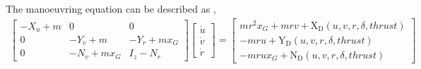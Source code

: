 The manoeuvring equation can be described as \cite{fossen_handbook_2021},
\begin{equation}\label{equation:02.01_manoeuvring models:eqqsystem}
\begin{split}\displaystyle \left[\begin{matrix}- X_{\dot{u}} + m & 0 & 0\\0 & - Y_{\dot{v}} + m & - Y_{\dot{r}} + m x_{G}\\0 & - N_{\dot{v}} + m x_{G} & I_{z} - N_{\dot{r}}\end{matrix}\right] \left[\begin{matrix}\dot{u}\\\dot{v}\\\dot{r}\end{matrix}\right] = \left[\begin{matrix}m r^{2} x_{G} + m r v + \operatorname{X_{D}}{\left(u,v,r,\delta,thrust \right)}\\- m r u + \operatorname{Y_{D}}{\left(u,v,r,\delta,thrust \right)}\\- m r u x_{G} + \operatorname{N_{D}}{\left(u,v,r,\delta,thrust \right)}\end{matrix}\right]\end{split}
\end{equation}

